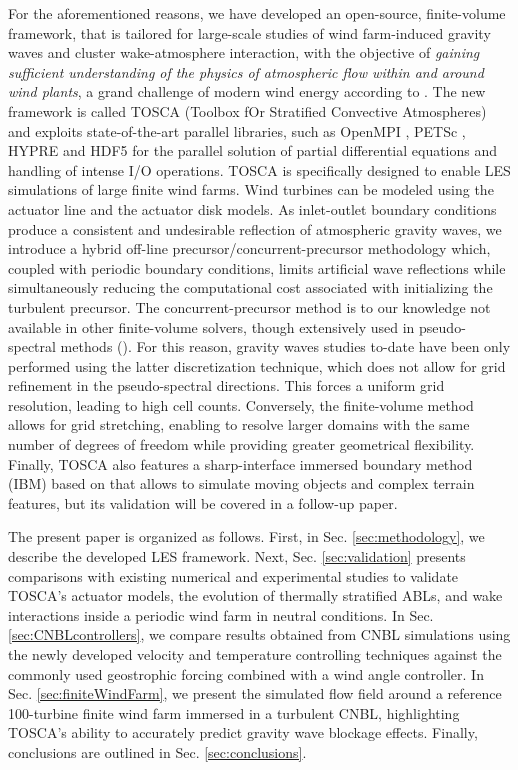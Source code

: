\documentclass[journal abbreviation, manuscript]{copernicus}
\begin{document}
For the aforementioned reasons, we have developed an open-source, finite-volume framework, that is tailored for large-scale studies of wind farm-induced gravity waves and cluster wake-atmosphere interaction, with the objective of \textit{gaining sufficient understanding of the physics of atmospheric flow within and around wind plants}, a grand challenge of modern wind energy according to \cite{2022_ShawEtAl}. The new framework is called TOSCA (Toolbox fOr Stratified Convective Atmospheres) and exploits state-of-the-art parallel libraries, such as OpenMPI \citep{2004_OpenMPI}, PETSc \citep{petscUserRef}, HYPRE \citep{2002_Falgout} and HDF5 \citep{hdf5} for the parallel solution of partial differential equations and handling of intense I/O operations. TOSCA is specifically designed to enable LES simulations of large finite wind farms. Wind turbines can be modeled using the actuator line \citep{2002_Sorensen} and the actuator disk \citep{2007_JimenezEtAl, 2008_Jimenez} models. As inlet-outlet boundary conditions produce a consistent and undesirable reflection of atmospheric gravity waves, we introduce a hybrid off-line precursor/concurrent-precursor methodology which, coupled with periodic boundary conditions, limits artificial wave reflections while simultaneously reducing the computational cost associated with initializing the turbulent precursor. The concurrent-precursor method \citep{2014_InoueEtAl} is to our knowledge not available in other finite-volume solvers, though extensively used in pseudo-spectral methods (\citealp{2017_WuPorteAgel, 2017a_AllaertsMeyers, 2017b_AllaertsMayers}). For this reason, gravity waves studies to-date have been only performed using the latter discretization technique, which does not allow for grid refinement in the pseudo-spectral directions. This forces a uniform grid resolution, leading to high cell counts. Conversely, the finite-volume method allows for grid stretching, enabling to resolve larger domains with the same number of degrees of freedom while providing greater geometrical flexibility. Finally, TOSCA also features a sharp-interface immersed boundary method (IBM) based on \cite{2019_MohammadiEtAl} that allows to simulate moving objects and complex terrain features, but its validation will be covered in a follow-up paper.  

The present paper is organized as follows. First, in Sec. \ref{sec:methodology}, we describe the developed LES framework.  Next, Sec. \ref{sec:validation} presents comparisons with existing numerical and experimental studies to validate TOSCA's actuator models, the evolution of thermally stratified ABLs, and wake interactions inside a periodic wind farm in neutral conditions. In Sec. \ref{sec:CNBLcontrollers}, we compare results obtained from CNBL simulations using the newly developed velocity and temperature controlling techniques against the commonly used geostrophic forcing combined with a wind angle controller. In Sec. \ref{sec:finiteWindFarm}, we present the simulated flow field around a reference 100-turbine finite wind farm immersed in a turbulent CNBL, highlighting TOSCA's ability to accurately predict gravity wave blockage effects. Finally, conclusions are outlined in Sec. \ref{sec:conclusions}.
\end{document}
